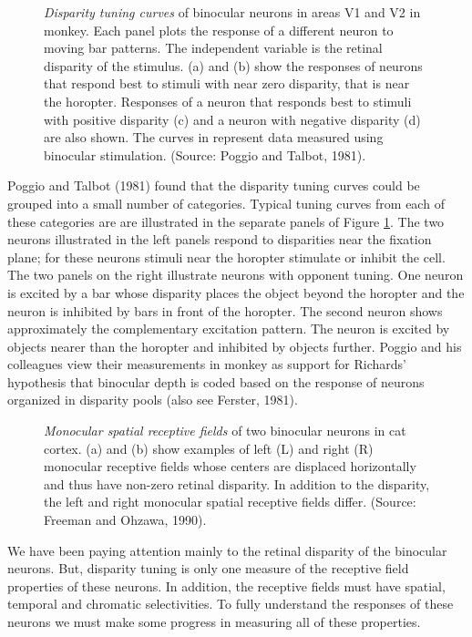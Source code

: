 \begin{figure}
\centerline{
}
\caption[Binocular Neurons and the Pool Hypothesis]{
{\em Disparity tuning curves} of binocular neurons in areas V1 and V2
in monkey.  Each panel plots the response of a different neuron to
moving bar patterns.  The independent variable is the retinal
disparity of the stimulus.
(a) and (b) show the responses of neurons
that respond best to stimuli with near zero disparity, that is near
the horopter.  Responses of a neuron that responds best to stimuli
with positive disparity (c) and a neuron with negative disparity (d)
are also shown.  The curves in represent data
measured using binocular stimulation.  
(Source: Poggio and Talbot, 1981).
}
\label{f5:binoc}
\end{figure}
Poggio and Talbot (1981) found that the disparity tuning curves
could be grouped into a small number of categories.
Typical tuning curves
from each of these categories are are illustrated in
the separate panels of Figure \ref{f5:binoc}.
The two neurons illustrated
in the left panels respond to disparities
near the fixation plane;
for these neurons stimuli near the
horopter stimulate or inhibit the cell.
The two panels on the right
illustrate neurons with opponent tuning.
One neuron is excited by a bar whose
disparity places the object beyond
the horopter and the neuron is inhibited by bars in front of the horopter.
The second neuron shows approximately the complementary
excitation pattern.
The neuron is excited by objects nearer than the 
horopter and inhibited by objects further.
Poggio and his colleagues view their measurements in monkey
as support for Richards' hypothesis that binocular
depth is coded based on the response of neurons
organized in disparity pools (also see Ferster, 1981).

\begin{figure}
\centerline{
}
\caption[Monocular Spatial Receptive Fields of Cat Binocular Neurons]{
{\em Monocular spatial receptive fields} of 
two binocular neurons in cat cortex.
(a) and (b) show examples of left (L) and right (R)
monocular receptive fields whose centers are displaced
horizontally and thus have non-zero retinal disparity.
In addition to the disparity, the left
and right monocular spatial receptive fields differ.
(Source: Freeman and Ohzawa, 1990).
}
\label{f5:ohzawa}
\end{figure}
We have been paying attention mainly to the retinal disparity
of the binocular neurons.
But, disparity tuning is only one measure of the receptive field
properties of these neurons.
In addition, the receptive fields must have spatial,
temporal and chromatic selectivities.
To fully understand the responses of these neurons we must make
some progress in measuring all of these properties.


